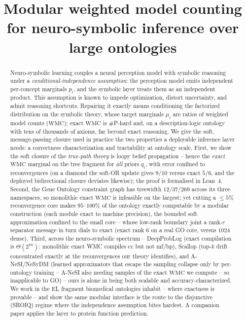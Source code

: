 \documentclass[anon]{nesy2026}
\title[Modular WMC for NeSy]{Modular weighted model counting for neuro-symbolic inference over large ontologies}
\newcommand{\WMC}{\ensuremath{\mathrm{WMC}}}
\newcommand{\tw}{\ensuremath{\mathrm{tw}}}
\begin{document}
\maketitle

\begin{abstract}
\noindent Neuro-symbolic learning couples a neural perception model with symbolic reasoning under a
\emph{conditional-independence assumption}: the perception model emits independent per-concept
marginals $p_i$, and the symbolic layer treats them as an independent product. This assumption is
known to impede optimization, distort uncertainty, and admit reasoning shortcuts. Repairing it
exactly means conditioning the factorized distribution on the symbolic theory, whose target
marginals $\mu_i$ are ratios of weighted model counts ($\WMC$); exact $\WMC$ is $\#$P-hard and, on a
description-logic ontology with tens of thousands of axioms, far beyond exact reasoning. We give the
soft, message-passing closure used in practice the two properties a deployable inference layer needs:
a correctness characterization and tractability at ontology scale. First, we show the
soft closure of the \emph{true-path theory} is loopy belief propagation -- hence the \emph{exact}
$\WMC$ marginal on the tree fragment for \emph{all} priors $q_i$, with error confined to
reconvergences (on a diamond the soft-OR update gives $9/10$ versus exact $5/6$, and the deployed
bidirectional closure deviates likewise); the proof is formalised in Lean~4. Second, the Gene Ontology
constraint graph has treewidth $12$/$37$/$269$ across its three namespaces, so monolithic exact
$\WMC$ is infeasible on the largest; yet cutting a ${\le}5\%$ reconvergence core makes $95$--$100\%$ of
the ontology exactly computable by a modular construction (each module exact to machine precision),
the bounded soft approximation confined to
the small core -- whose low-rank boundary joint a rank-$r$ separator message in turn dials to exact
(exact rank $6$ on a real GO core, versus $1024$ dense). Third, across the neuro-symbolic spectrum -- DeepProbLog (exact compilation is $\Theta(2^{\tw})$:
monolithic exact WMC compiles cc but not mf/bp), Scallop (top-$k$ drift concentrated exactly at
the reconvergences our theory identifies), and A-NeSI/NeSyDM (learned approximators that escape the
sampling collapse only by per-ontology training -- A-NeSI also needing samples of the exact $\WMC$
we compute -- so inapplicable to GO) -- ours is alone in being
both scalable and accuracy-characterized. We work in the EL fragment biomedical ontologies inhabit -- where exactness is
provable -- and show the same modular interface is the route to the disjunctive (SROIQ) regime where
the independence assumption bites hardest. A companion paper applies the layer to protein
function prediction.
\end{abstract}
\end{document}
